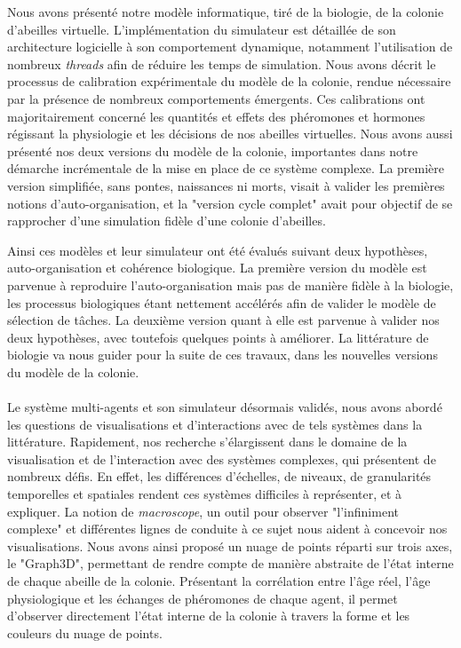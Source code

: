 Nous avons présenté notre modèle informatique, tiré de la biologie, de la colonie d'abeilles virtuelle. L'implémentation du simulateur est détaillée de son architecture logicielle à son comportement dynamique, notamment l'utilisation de nombreux \textit{threads} afin de réduire les temps de simulation. Nous avons décrit le processus de calibration expérimentale du modèle de la colonie, rendue nécessaire par la présence de nombreux comportements émergents. Ces calibrations ont majoritairement concerné les quantités et effets des phéromones et hormones régissant la physiologie et les décisions de nos abeilles virtuelles. Nous avons aussi présenté nos deux versions du modèle de la colonie, importantes dans notre démarche incrémentale de la mise en place de ce système complexe. La première version simplifiée, sans pontes, naissances ni morts, visait à valider les premières notions d'auto-organisation, et la "version cycle complet" avait pour objectif de se rapprocher d'une simulation fidèle d'une colonie d'abeilles.

Ainsi ces modèles et leur simulateur ont été évalués suivant deux hypothèses, auto-organisation et cohérence biologique. La première version du modèle est parvenue à reproduire l'auto-organisation mais pas de manière fidèle à la biologie, les processus biologiques étant nettement accélérés afin de valider le modèle de sélection de tâches. La deuxième version quant à elle est parvenue à valider nos deux hypothèses, avec toutefois quelques points à améliorer. La littérature de biologie va nous guider pour la suite de ces travaux, dans les nouvelles versions du modèle de la colonie.

\paragraph{}

Le système multi-agents et son simulateur désormais validés, nous avons abordé les questions de visualisations et d'interactions avec de tels systèmes dans la littérature. Rapidement, nos recherche s'élargissent dans le domaine de la visualisation et de l'interaction avec des systèmes complexes, qui présentent de nombreux défis. En effet, les différences d'échelles, de niveaux, de granularités temporelles et spatiales rendent ces systèmes difficiles à représenter, et à expliquer. La notion de \textit{macroscope}, un outil pour observer "l'infiniment complexe" et différentes lignes de conduite à ce sujet nous aident à concevoir nos visualisations. Nous avons ainsi proposé un nuage de points réparti sur trois axes, le "Graph3D", permettant de rendre compte de manière abstraite de l'état interne de chaque abeille de la colonie. Présentant la corrélation entre l'âge réel, l'âge physiologique et les échanges de phéromones de chaque agent, il permet d'observer directement l'état interne de la colonie à travers la forme et les couleurs du nuage de points.

